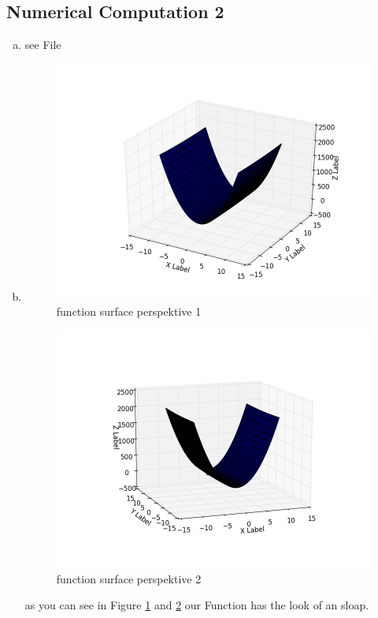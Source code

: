 \documentclass[12pt]{article}
\begin{document}
\subsection{Numerical Computation 2}
\begin{enumerate}[a)]
    \item 
        see File
    \item
        \begin{figure}[H]
            \centering
            \includegraphics[width=300pt]{pictures/figure_2.png}
            \caption{function surface perspektive 1}
            \label{fig:fig2}
        \end{figure}
        \begin{figure}[H]
            \centering
            \includegraphics[width=300pt]{pictures/figure_3.png}
            \caption{function surface perspektive 2}
            \label{fig:fig3}
        \end{figure}
        as you can see in Figure \ref{fig:fig2} and \ref{fig:fig3} our Function has the look of an sloap.\\

\end{enumerate}
\end{document}
